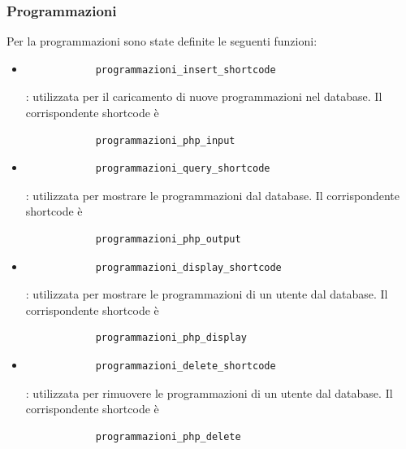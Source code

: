 \documentclass{article}
\begin{document}
		\subsubsection{\textbf{Programmazioni}}
		Per la programmazioni sono state definite le seguenti funzioni:
		\begin{itemize}
			\item \begin{verbatim}
			programmazioni_insert_shortcode
			\end{verbatim}: utilizzata per il caricamento di nuove programmazioni nel database.
			Il corrispondente shortcode è \begin{verbatim}
			programmazioni_php_input
			\end{verbatim}
			\item \begin{verbatim}
			programmazioni_query_shortcode
			\end{verbatim}: utilizzata per mostrare le programmazioni dal database. Il corrispondente shortcode è \begin{verbatim}
			programmazioni_php_output
			\end{verbatim}
			\item \begin{verbatim}
			programmazioni_display_shortcode
			\end{verbatim}: utilizzata per mostrare le programmazioni di un utente dal database. Il corrispondente shortcode è \begin{verbatim}
			programmazioni_php_display
			\end{verbatim}
			\item \begin{verbatim}
			programmazioni_delete_shortcode
			\end{verbatim}: utilizzata per rimuovere le programmazioni di un utente dal database. Il corrispondente shortcode è \begin{verbatim}
			programmazioni_php_delete
			\end{verbatim}
		\end{itemize}
	

	\pagebreak
\end{document}
